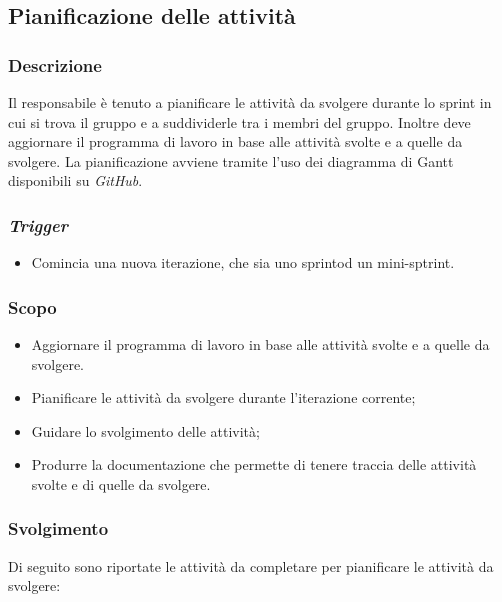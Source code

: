 \subsection{Pianificazione delle attività}
\label{pianificazione-attivia}

\subsubsection{Descrizione}
Il responsabile è tenuto a pianificare le attività da svolgere durante lo sprint
in cui si trova il gruppo e a suddividerle tra i membri del gruppo. Inoltre deve
aggiornare il programma di lavoro in base alle attività svolte e a quelle da
svolgere. La pianificazione avviene tramite l'uso dei diagramma di Gantt
disponibili su \textit{GitHub}.

\subsubsection{\textit{Trigger}}
\begin{itemize}
	\item Comincia una nuova iterazione, che sia uno sprint\g od un
	      mini-sptrint\g.
\end{itemize}

\subsubsection{Scopo}
\begin{itemize}
	\item Aggiornare il programma di lavoro in base alle attività svolte e a
	      quelle da svolgere.

	\item Pianificare le attività da svolgere durante l'iterazione corrente;

	\item Guidare lo svolgimento delle attività;

	\item Produrre la documentazione che permette di tenere traccia delle
	      attività svolte e di quelle da svolgere.
\end{itemize}

\subsubsection{Svolgimento}
Di seguito sono riportate le attività da completare per pianificare le attività
da svolgere:

